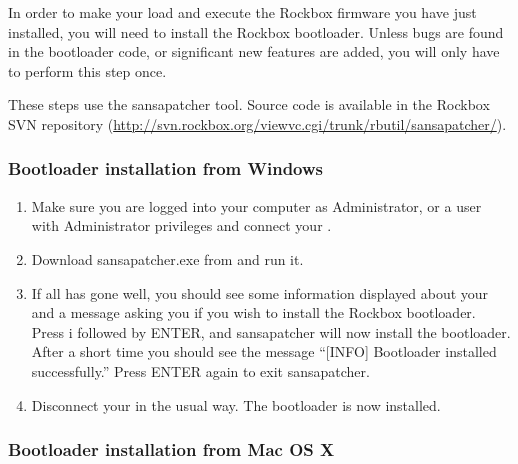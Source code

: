 

In order to make your \playertype{} load and execute the Rockbox firmware you
have just installed, you will need to install the Rockbox
bootloader. Unless bugs are found in the bootloader code, or
significant new features are added, you will only have to perform this
step once.

These steps use the sansapatcher tool. Source code is available in the Rockbox
SVN repository (\url{http://svn.rockbox.org/viewvc.cgi/trunk/rbutil/sansapatcher/}).

\subsubsection{Bootloader installation from Windows}

\begin{enumerate}

\item Make sure you are logged into your computer as Administrator, or a 
user with Administrator privileges and connect your \dap{}.

\item Download sansapatcher.exe from 
and run it.

\item If all has gone well, you should see some information displayed about
your \playertype{} and a message asking you if you wish to install the Rockbox
bootloader. Press i followed by ENTER, and sansapatcher will now
install the bootloader. After a short time you should see the message
``[INFO] Bootloader installed successfully.'' Press ENTER again to exit
sansapatcher.

\item Disconnect your \dap{} in the usual way. The bootloader is now installed. 

\end{enumerate}

\subsubsection{Bootloader installation from Mac OS X}

